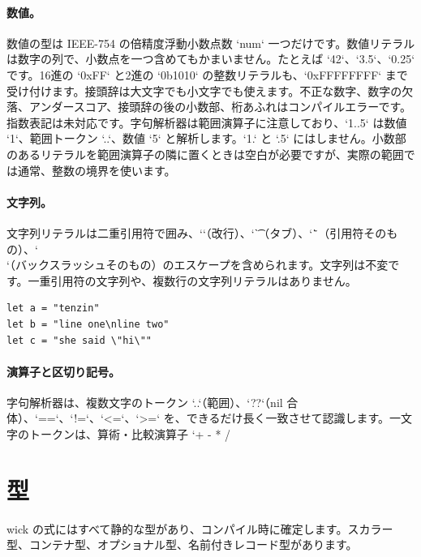 \paragraph{数値。} 数値の型は IEEE-754 の倍精度浮動小数点数 `num` 一つだけです。数値リテラルは数字の列で、小数点を一つ含めてもかまいません。たとえば `42`、`3.5`、`0.25` です。16進の `0xFF` と2進の `0b1010` の整数リテラルも、`0xFFFFFFFF` まで受け付けます。接頭辞は大文字でも小文字でも使えます。不正な数字、数字の欠落、アンダースコア、接頭辞の後の小数部、桁あふれはコンパイルエラーです。指数表記は未対応です。字句解析器は範囲演算子に注意しており、`1..5` は数値 `1`、範囲トークン `..`、数値 `5` と解析します。`1.` と `.5` にはしません。小数部のあるリテラルを範囲演算子の隣に置くときは空白が必要ですが、実際の範囲では通常、整数の境界を使います。

\paragraph{文字列。} 文字列リテラルは二重引用符で囲み、`\n`（改行）、`\t`（タブ）、`\"`（引用符そのもの）、`\\`（バックスラッシュそのもの）のエスケープを含められます。文字列は不変です。一重引用符の文字列や、複数行の文字列リテラルはありません。

\begin{lstlisting}[language=wick]
let a = "tenzin"
let b = "line one\nline two"
let c = "she said \"hi\""
\end{lstlisting}

\paragraph{演算子と区切り記号。} 字句解析器は、複数文字のトークン `..`（範囲）、`??`（nil 合体）、`==`、`!=`、`<=`、`>=` を、できるだけ長く一致させて認識します。一文字のトークンは、算術・比較演算子 `+ - * / %

\section{型}

wick の式にはすべて静的な型があり、コンパイル時に確定します。スカラー型、コンテナ型、オプショナル型、名前付きレコード型があります。

